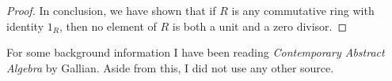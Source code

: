 \begin{proof}
In conclusion, we have shown that if $R$ is any commutative ring with identity $1_R$, then no element of $R$ is both a unit and a zero divisor.
\end{proof}

For some background information I have been reading {\it Contemporary Abstract Algebra} by Gallian.  Aside from this, I did not use any other source.

